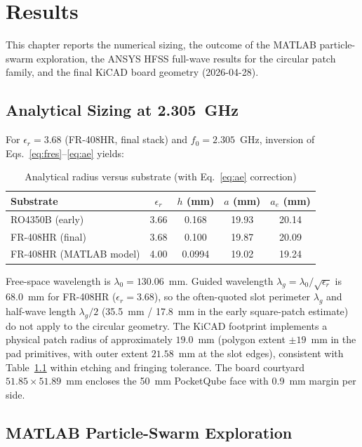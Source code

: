 %
%
%
%

\chapter{Results}

This chapter reports the numerical sizing, the outcome of the MATLAB particle-swarm exploration, the ANSYS HFSS full-wave results for the circular patch family, and the final KiCAD board geometry (2026-04-28).

\section{Analytical Sizing at 2.305~GHz}

For $\epsilon_r = 3.68$ (FR-408HR, final stack) and $f_0 = 2.305$~GHz, inversion of Eqs.~\ref{eq:fres}--\ref{eq:ae} yields:

\begin{table}[H]
\centering
\caption{Analytical radius versus substrate (with Eq.~\ref{eq:ae} correction)}
\label{tab:radius}
\begin{tabular}{l c c c c}
\toprule
Substrate & $\epsilon_r$ & $h$ (mm) & $a$ (mm) & $a_e$ (mm) \\
\midrule
RO4350B (early) & 3.66 & 0.168 & 19.93 & 20.14 \\
FR-408HR (final) & 3.68 & 0.100 & 19.87 & 20.09 \\
FR-408HR (MATLAB model) & 4.00 & 0.0994 & 19.02 & 19.24 \\
\bottomrule
\end{tabular}
\end{table}

Free-space wavelength is $\lambda_0 = 130.06$~mm. Guided wavelength $\lambda_g = \lambda_0/\sqrt{\epsilon_r}$ is $68.0$~mm for FR-408HR ($\epsilon_r=3.68$), so the often-quoted slot perimeter $\lambda_g$ and half-wave length $\lambda_g/2$ (35.5~mm / 17.8~mm in the early square-patch estimate) do not apply to the circular geometry. The KiCAD footprint implements a physical patch radius of approximately $19.0$~mm (polygon extent $\pm 19$~mm in the pad primitives, with outer extent $21.58$~mm at the slot edges), consistent with Table~\ref{tab:radius} within etching and fringing tolerance. The board courtyard $51.85 \times 51.89$~mm encloses the 50~mm PocketQube face with 0.9~mm margin per side.

\section{MATLAB Particle-Swarm Exploration}

